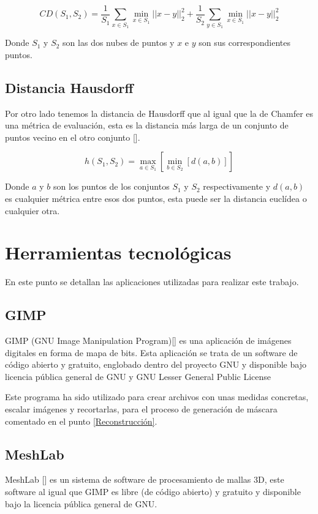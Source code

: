 \begin{equation}
	\label{eq:6}
	CD(S_{1}, S_{2}) = 
	\frac{1}{S_{1}} \sum_{x \in S_{1}}{} \min_{x \in S_1}|| x - y ||_{2}^{2} +
	\frac{1}{S_{2}} \sum_{y \in S_{1}}{} \min_{x \in S_1}|| x - y ||_{2}^{2}
\end{equation}

Donde $S_{1}$ y $S_{2}$ son las dos nubes de puntos y $x$ e $y$ son sus correspondientes puntos.

\subsection{Distancia Hausdorff}
Por otro lado tenemos la distancia de Hausdorff que al igual que la de Chamfer es una métrica de evaluación, esta es la distancia más larga de un conjunto de puntos vecino en el otro conjunto [\cite{grégoire_bouillot_2022}].

\begin{equation}
	\label{eq:7}
	h(S_{1}, S_{2}) = 
	\max_{a \in S_{1}} [ \min_{b \in S_{2}} [d(a,b)]]
\end{equation}

Donde $a$ y $b$ son los puntos de los conjuntos $S_{1}$ y $S_{2}$ respectivamente y $d(a,b)$ es cualquier métrica entre esos dos puntos, esta puede ser la distancia euclídea o cualquier otra.


\section{Herramientas tecnológicas}
En este punto se detallan las aplicaciones utilizadas para realizar este trabajo.

\subsection{GIMP}
GIMP (GNU Image Manipulation Program)[\cite{gimp}] es una aplicación de imágenes digitales en forma de mapa de bits. Esta aplicación se trata de un software de código abierto y gratuito, englobado dentro del proyecto GNU y disponible bajo licencia pública general de GNU y GNU Lesser General Public License

Este programa ha sido utilizado para crear archivos con unas medidas concretas, escalar imágenes y recortarlas, para el proceso de generación de máscara comentado en el punto \ref{Reconstrucción}.
\subsection{MeshLab}
MeshLab [\cite{MeshLab}] es un sistema de software de procesamiento de mallas 3D, este software al igual que GIMP es libre (de código abierto) y gratuito y disponible bajo la licencia pública general de GNU. 

